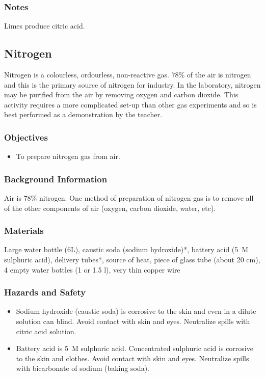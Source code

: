 \subsubsection*{Notes}
Limes produce citric acid. 

\subsection{Nitrogen}

Nitrogen is a colourless, ordourless, non-reactive gas. 78\% of the air is nitrogen and this is the primary source of nitrogen for industry. In the laboratory, nitrogen may be purified from the air by removing oxygen and carbon dioxide. This activity requires a more complicated set-up than other gas experiments and so is best performed as a demonstration by the teacher.

\subsubsection*{Objectives}
\begin{itemize}
\item{To prepare nitrogen gas from air.}
\end{itemize}

\subsubsection*{Background Information}
Air is 78\% nitrogen. One method of preparation of nitrogen gas is to remove all of the other components of air (oxygen, carbon dioxide, water, etc).

\subsubsection*{Materials}
Large water bottle (6L), caustic soda (sodium hydroxide)*, battery acid (5~M sulphuric acid), delivery tubes*, source of heat, piece of glass tube (about 20 cm), 4 empty water bottles (1 or 1.5 l), very thin copper wire

\subsubsection*{Hazards and Safety}
\begin{itemize}
\item{Sodium hydroxide (caustic soda) is corrosive to the skin and even in a dilute solution can blind. Avoid contact with skin and eyes. Neutralize spills with citric acid solution.}
\item{Battery acid is 5~M sulphuric acid. Concentrated sulphuric acid is corrosive to the skin and clothes. Avoid contact with skin and eyes. Neutralize spills with bicarbonate of sodium (baking soda).}
\end{itemize}

